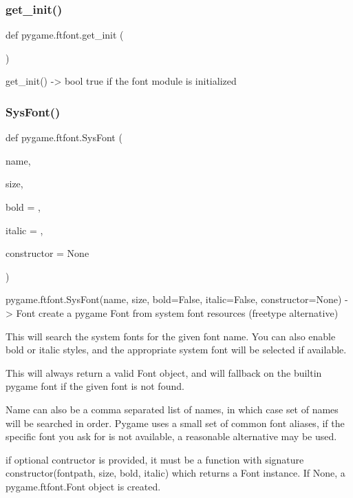 \subsubsection{\texorpdfstring{get\+\_\+init()}{get\_init()}}
{\footnotesize\ttfamily def pygame.\+ftfont.\+get\+\_\+init (\begin{DoxyParamCaption}{ }\end{DoxyParamCaption})}

\begin{DoxyVerb}get_init() -> bool
   true if the font module is initialized\end{DoxyVerb}
 \mbox{\label{namespacepygame_1_1ftfont_a1e2a89b4d0dfdbaee9aadb6b2293c5c5}} 
\subsubsection{\texorpdfstring{Sys\+Font()}{SysFont()}}
{\footnotesize\ttfamily def pygame.\+ftfont.\+Sys\+Font (\begin{DoxyParamCaption}\item[{}]{name,  }\item[{}]{size,  }\item[{}]{bold = {},  }\item[{}]{italic = {},  }\item[{}]{constructor = {\ttfamily None} }\end{DoxyParamCaption})}

\begin{DoxyVerb}pygame.ftfont.SysFont(name, size, bold=False, italic=False, constructor=None) -> Font
   create a pygame Font from system font resources (freetype alternative)

   This will search the system fonts for the given font
   name. You can also enable bold or italic styles, and
   the appropriate system font will be selected if available.

   This will always return a valid Font object, and will
   fallback on the builtin pygame font if the given font
   is not found.

   Name can also be a comma separated list of names, in
   which case set of names will be searched in order. Pygame
   uses a small set of common font aliases, if the specific
   font you ask for is not available, a reasonable alternative
   may be used.

   if optional contructor is provided, it must be a function with
   signature constructor(fontpath, size, bold, italic) which returns
   a Font instance. If None, a pygame.ftfont.Font object is created.
\end{DoxyVerb}
 